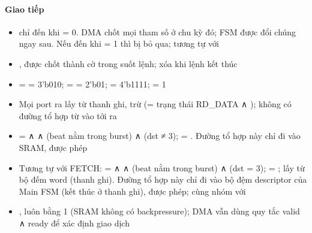 \documentclass[10pt,a4paper]{article}
\begin{document}
\paragraph{Giao tiếp}
\begin{itemize}
\item {} chỉ đến khi  = 0. DMA chốt mọi tham số ở chu kỳ đó; FSM được đổi chúng ngay sau. Nếu  đến khi  = 1 thì bị bỏ qua; tương tự  với 
\item {},  được chốt thành cờ  trong suốt lệnh; xóa khi lệnh kết thúc
\item {} =  = 3'b010;  =  = 2'b01;  = 4'b1111;  = 1
\item Mọi port  ra lấy từ thanh ghi, trừ  (= trạng thái RD\_DATA ∧ ); không có đường tổ hợp từ  vào tới  ra
\item {} =  ∧  ∧ (beat nằm trong burst) ∧ (dst ≠ 3);  = . Đường tổ hợp này chỉ đi vào SRAM, được phép
\item Tương tự với FETCH:  =  ∧  ∧ (beat nằm trong burst) ∧ (dst = 3);  = ;  lấy từ bộ đếm word (thanh ghi). Đường tổ hợp này chỉ đi vào bộ đệm descriptor của Main FSM (kết thúc ở thanh ghi), được phép; cùng nhóm với 
\item {},  luôn bằng 1 (SRAM không có backpressure); DMA vẫn dùng quy tắc valid ∧ ready để xác định giao dịch
\end{itemize}

\end{document}

